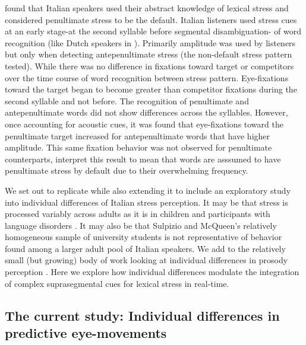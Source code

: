 \cite{Sulpizio_McQueen_2012} found that Italian speakers used their abstract knowledge of lexical stress and considered penultimate stress to be the default. Italian listeners used stress cues at an early stage-at the second syllable before segmental disambiguation- of word recognition (like Dutch speakers in \cite{Reinisch2010}). Primarily amplitude was used by listeners but only when detecting antepenultimate stress (the non-default stress pattern tested). While there was no difference in fixations toward target or competitors over the time course of word recognition between stress pattern. Eye-fixations toward the target began to become greater than competitor fixations during the second syllable and not before. The recognition of penultimate and antepenultimate words did not show differences across the syllables. However, once accounting for acoustic cues, it was found that eye-fixations toward the penultimate target increased for antepenultimate words that have higher amplitude. This same fixation behavior was not observed for penultimate counterparts, \cite{Sulpizio_McQueen_2012} interpret this result to mean that words are asssumed to have penultimate stress by default due to their overwhelming frequency. 

We set out to replicate \cite{Sulpizio_McQueen_2012} while also extending it to include an exploratory study into individual differences of Italian stress perception. It may be that stress is processed variably across adults as it is in children \citep[e.g.,][]{Colombo2014} and participants with language disorders \citep[e.g.,li][]{Cappa1997}. It may also be that Sulpizio and McQueen's relatively homogeneous sample of university students is not representative of behavior found among a larger adult pool of Italian speakers. We add to the relatively small (but growing) body of work looking at individual differences in prosody perception \citep[e.g.,][]{Roy2017, Bishop2017, Lameris2023}. Here we explore how individual differences modulate the integration of complex suprasegmental cues for lexical stress in real-time.


\subsection{The current study: Individual differences in predictive eye-movements}

